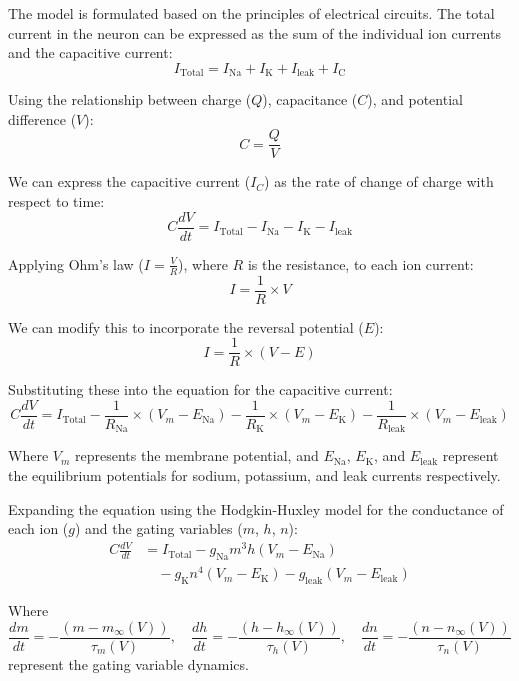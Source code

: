 \documentclass[12pt,a4paper]{report}
\begin{document}
The model is formulated based on the principles of electrical circuits. The total current in the neuron can be expressed as the sum of the individual ion currents and the capacitive current:
\[
I_{\text{Total}} = I_{\text{Na}} + I_{\text{K}} + I_{\text{leak}} + I_{\text{C}}
\]

Using the relationship between charge ($Q$), capacitance ($C$), and potential difference ($V$):
\[
C = \frac{Q}{V}
\]

We can express the capacitive current ($I_C$) as the rate of change of charge with respect to time:
\[
C \frac{dV}{dt} = I_{\text{Total}} - I_{\text{Na}} - I_{\text{K}} - I_{\text{leak}}
\]

Applying Ohm's law ($I = \frac{V}{R}$), where $R$ is the resistance, to each ion current:
\[
I = \frac{1}{R} \times V
\]

We can modify this to incorporate the reversal potential ($E$):
\[
I = \frac{1}{R} \times (V - E)
\]

Substituting these into the equation for the capacitive current:
\[
C \frac{dV}{dt} = I_{\text{Total}} - \frac{1}{R_{\text{Na}}} \times (V_m - E_{\text{Na}}) - \frac{1}{R_{\text{K}}} \times (V_m - E_{\text{K}}) - \frac{1}{R_{\text{leak}}} \times (V_m - E_{\text{leak}})
\]

Where $V_m$ represents the membrane potential, and $E_{\text{Na}}$, $E_{\text{K}}$, and $E_{\text{leak}}$ represent the equilibrium potentials for sodium, potassium, and leak currents respectively.

Expanding the equation using the Hodgkin-Huxley model for the conductance of each ion ($g$) and the gating variables ($m$, $h$, $n$):
\begin{align*}
C \frac{dV}{dt} & = I_{\text{Total}} - g_{\text{Na}} m^3 h (V_m - E_{\text{Na}}) \\
                 & \quad - g_{\text{K}} n^4 (V_m - E_{\text{K}}) - g_{\text{leak}} (V_m - E_{\text{leak}})
\end{align*}

Where
\[
\frac{dm}{dt} = -\frac{(m - m_{\infty}(V))}{\tau_m(V)}, \quad \frac{dh}{dt} = -\frac{(h - h_{\infty}(V))}{\tau_h(V)}, \quad \frac{dn}{dt} = -\frac{(n - n_{\infty}(V))}{\tau_n(V)}
\]
represent the gating variable dynamics.
\end{document}
